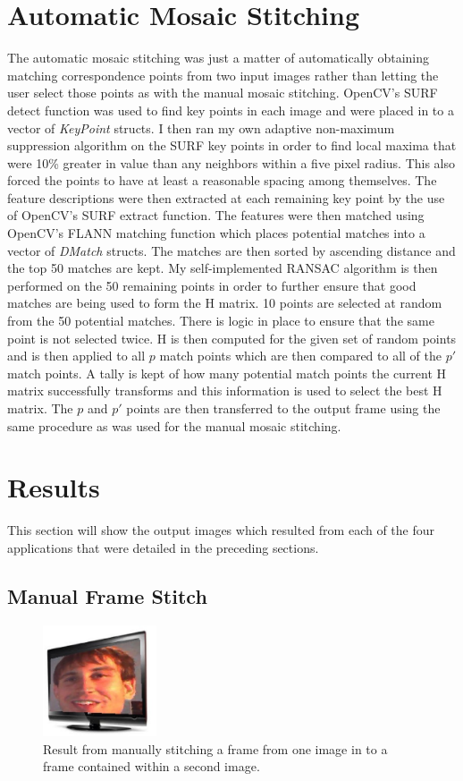 \documentclass[10pt,twocolumn,letterpaper]{article}
\begin{document}
\section{Automatic Mosaic Stitching}
The automatic mosaic stitching was just a matter of automatically obtaining matching correspondence points from two input images rather than letting the user select those points as with the manual mosaic stitching. OpenCV's SURF detect function was used to find key points in each image and were placed in to a vector of \emph{KeyPoint} structs. I then ran my own adaptive non-maximum suppression algorithm on the SURF key points in order to find local maxima that were 10\% greater in value than any neighbors within a five pixel radius. This also forced the points to have at least a reasonable spacing among themselves. The feature descriptions were then extracted at each remaining key point by the use of OpenCV's SURF extract function. The features were then matched using OpenCV's FLANN matching function which places potential matches into a vector of \emph{DMatch} structs. The matches are then sorted by ascending distance and the top 50 matches are kept. My self-implemented RANSAC algorithm is then performed on the 50 remaining points in order to further ensure that good matches are being used to form the H matrix. 10 points are selected at random from the 50 potential matches. There is logic in place to ensure that the same point is not selected twice. H is then computed for the given set of random points and is then applied to all $p$ match points which are then compared to all of the $p'$ match points. A tally is kept of how many potential match points the current H matrix successfully transforms and this information is used to select the best H matrix. The $p$ and $p'$ points are then transferred to the output frame using the same procedure as was used for the manual mosaic stitching.

\section{Results}
This section will show the output images which resulted from each of the four applications that were detailed in the preceding sections.

\subsection{Manual Frame Stitch}

\begin{figure}[ht!]
\centering
\includegraphics[width=0.3\textwidth]{img/tv_man_out.eps}
\caption{Result from manually stitching a frame from one image in to a frame contained within a second image.}
\label{fig:man_frame_tv_res}
\end{figure}
\end{document}
